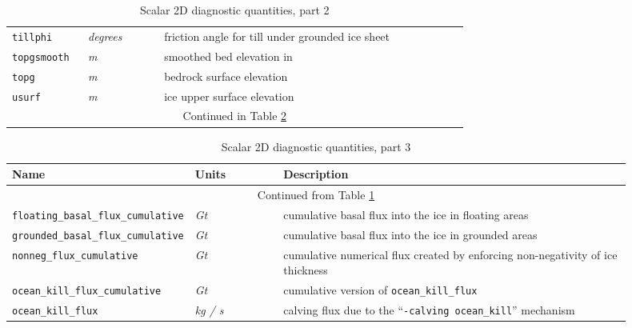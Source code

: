 \begin{table}[ht]
\begin{tabular}{p{0.15\linewidth}p{0.15\linewidth}p{0.6\linewidth}}
    \texttt{tillphi} & \textsl{degrees} & friction angle for till under grounded ice sheet \\
    \texttt{topgsmooth} & \textsl{m} &  smoothed bed elevation in \cite{Schoofbasaltopg2003}\\
    \texttt{topg} & \textsl{m} & bedrock surface elevation \\
    \texttt{usurf} & \textsl{m} & ice upper surface elevation \\
   \multicolumn{3}{c}{Continued in Table \ref{tab:two-d-diagnostics-3}}\\
  \bottomrule
  \end{tabular}
  \caption{Scalar 2D diagnostic quantities, part 2}
  \label{tab:two-d-diagnostics-2}
\end{table}

\begin{table}[ht]
  \centering
  \begin{tabular}{p{0.15\linewidth}p{0.15\linewidth}p{0.6\linewidth}}
    \toprule
    \textbf{Name} & \textbf{Units} & \textbf{Description} \\
    \midrule
    \multicolumn{3}{c}{Continued from Table \ref{tab:two-d-diagnostics-2}}\\
    \texttt{floating_basal_flux_cumulative} & \textsl{Gt} & cumulative basal flux into the ice in floating areas \\
    \texttt{grounded_basal_flux_cumulative} & \textsl{Gt} & cumulative basal flux into the ice in grounded areas \\
    \texttt{nonneg_flux_cumulative} & \textsl{Gt} & cumulative numerical flux created by enforcing non-negativity of ice thickness \\
    \texttt{ocean_kill_flux_cumulative} & \textsl{Gt} & cumulative version of \texttt{ocean_kill_flux} \\
    \texttt{ocean_kill_flux} & \textsl{kg / s} & calving flux due to the ``\texttt{-calving ocean_kill}'' mechanism \\
    \bottomrule
  \end{tabular}
  \caption{Scalar 2D diagnostic quantities, part 3}
  \label{tab:two-d-diagnostics-3}
\end{table}

